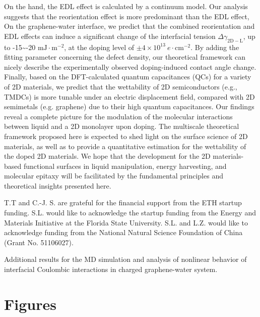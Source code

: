 \documentclass[journal=jacsat,manuscript=article,email=true,hyperref=true,keywords=true]{achemso}
\begin{document}
On the hand, the EDL effect is calculated by a continuum model. Our
analysis suggests that the reorientation effect is more predominant
than the EDL effect, On the graphene-water interface, we predict that
the combined reorientation and EDL effects can induce a significant
change of the interfacial tension \(\Delta
\gamma_{\mathrm{2D-L}}\), up to -15\textasciitilde{}-20 \(\mathrm{mJ}\cdot
\mathrm{m}^{-2}\), at the doping level of \(\pm 4 \times 10^{13}\ e\cdot
\mathrm{cm}^{-2}\). By adding the fitting parameter concerning the
defect density, our theoretical framework can nicely describe the
experimentally observed doping-induced contact angle change. Finally,
based on the DFT-calculated quantum capacitances (QCs) for a variety
of 2D materials, we predict that the wettability of 2D semiconductors
(e.g., TMDCs) is more tunable under an electric displacement field,
compared with 2D semimetals (e.g. graphene) due to their high quantum
capacitances. Our findings reveal a complete picture for the
modulation of the molecular interactions between liquid and a 2D monolayer upon
doping. The multiscale theoretical
framework proposed here is expected to shed
light on the surface science of 2D materials, 
as well as to provide a quantitative estimation for the wettability
of the doped 2D materials. We hope that the development for the 2D
materials-based functional surfaces in liquid manipulation, energy
harvesting, and molecular epitaxy will be facilitated by the
fundamental principles and theoretical insights presented here.

\begin{acknowledgement}
T.T and C.-J. S. are grateful for the financial support from the ETH startup funding.
S.L. would like to acknowledge the startup funding from the
Energy and Materials Initiative at the Florida State University. S.L. and L.Z. would 
like to acknowledge funding from the National Natural Science Foundation of China 
(Grant No. 51106027).
\end{acknowledgement}

\begin{suppinfo}
Additional results for the MD simulation and analysis of nonlinear
behavior of interfacial Coulombic interactions in charged
graphene-water system.
\end{suppinfo}






\newpage{}
\section{Figures}
\label{sec:orgb7fbb04}
\end{document}
